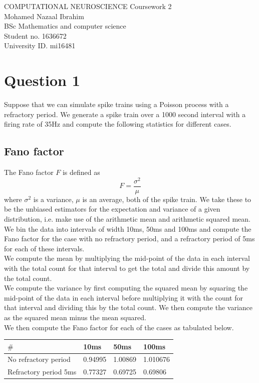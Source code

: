 \documentclass[12pt]{article}
\begin{document}
\begin{titlepage}\centering
    \LARGE COMPUTATIONAL NEUROSCIENCE
    \LARGE Coursework 2\\
    \Large Mohamed Nazaal Ibrahim\\
    \Large BSc Mathematics and computer science\\
    \Large Student no. 1636672\\
    \Large University ID. mi16481
\end{titlepage}

\setcounter{secnumdepth}{0}
\section{Question 1}
Suppose that we can simulate spike trains using a Poisson process with a refractory period. We generate a spike train over a 1000 second interval with a firing rate of 35Hz and compute the following statistics for different cases.

\subsection{Fano factor}
The Fano factor $F$ is defined as
\begin{equation}
    F = \frac{\sigma^2}{\mu}
\end{equation}
where $\sigma^2$ is a variance, $\mu$ is an average, both of the spike train. We take these to be the unbiased estimators for the expectation and variance of a given distribution, i.e. make use of the arithmetic mean and arithmetic squared mean. \\
We bin the data into intervals of width 10ms, 50ms and 100ms and compute the Fano factor for the case with no refractory period, and a refractory period of 5ms for each of these intervals.\\
We compute the mean by multiplying the mid-point of the data in each interval with the total count for that interval to get the total and divide this amount by the total count.\\
We compute the variance by first computing the squared mean by squaring the mid-point of the data in each interval before multiplying it with the count for that interval and dividing this by the total count. We then compute the variance as the squared mean minus the mean squared.\\
We then compute the Fano factor for each of the cases as tabulated below.

\begin{center}
    \begin{tabular}{ | m{4cm} | m{2cm}| m{2cm} | m{2cm} | } 
    \hline
    $\#$ & 10ms & 50ms & 100ms \\ 
    \hline
    No refractory  period & 0.94995 & 1.00869 & 1.010676 \\ 
    \hline
    Refractory period 5ms & 0.77327 & 0.69725 & 0.69806\\ 
    \hline
    \end{tabular}
\end{center}
\end{document}
